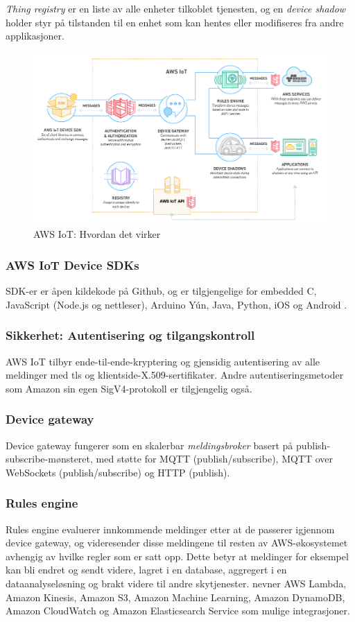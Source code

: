 \textit{Thing registry} er en liste av alle enheter tilkoblet tjenesten, og en \textit{device shadow}
holder styr på tilstanden til en enhet som kan hentes eller modifiseres fra andre applikasjoner.

\begin{figure}
\includegraphics[width=1.0\textwidth,center]{fig/awsiot_how}
\caption{AWS IoT: Hvordan det virker \citep{aws_works}}
\label{fig:awsiot_how}
\end{figure}

\subsubsection{AWS IoT Device SDKs}
SDK-er er åpen kildekode på Github, og er tilgjengelige for embedded C, JavaScript (Node.js og nettleser),
Arduino Yún, Java, Python, iOS og Android \citep{aws_sdks}.

\subsubsection{Sikkerhet: Autentisering og tilgangskontroll}
AWS IoT tilbyr ende-til-ende-kryptering og gjensidig autentisering av alle meldinger med
\gls{tls} og klientside-X.509-sertifikater. Andre autentiseringsmetoder som Amazon sin egen SigV4-protokoll
er tilgjengelig også.

\subsubsection{Device gateway}
Device gateway fungerer som en skalerbar \textit{meldingsbroker} basert på publish-subscribe-mønsteret,
med støtte for MQTT (publish/subscribe), MQTT over WebSockets (publish/subscribe) og HTTP (publish).

\subsubsection{Rules engine}
Rules engine evaluerer innkommende meldinger etter at de passerer igjennom device gateway,
og videresender disse meldingene til resten av AWS-økosystemet avhengig av hvilke regler som er satt opp.
Dette betyr at meldinger for eksempel kan bli endret og sendt videre, lagret i en database, aggregert i en
dataanalyseløsning og brakt videre til andre skytjenester. \citet{aws_works} nevner AWS Lambda, Amazon Kinesis,
Amazon S3, Amazon Machine Learning, Amazon DynamoDB, Amazon CloudWatch og Amazon Elasticsearch Service som mulige
integrasjoner.

